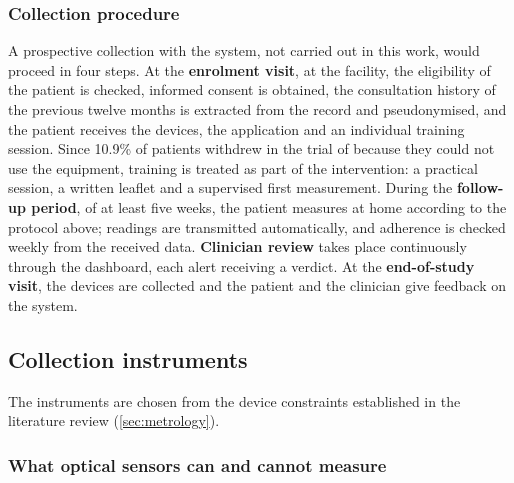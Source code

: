 \subsubsection{Collection procedure}\label{sec:procedure}

A prospective collection with the system, not carried out in this work, would proceed in four steps. At the \textbf{enrolment visit}, at the facility, the eligibility of the patient is checked, informed consent is obtained, the consultation history of the previous twelve months is extracted from the record and pseudonymised, and the patient receives the devices, the application and an individual training session. Since 10.9\% of patients withdrew in the trial of \textcite{mihevc2025} because they could not use the equipment, training is treated as part of the intervention: a practical session, a written leaflet and a supervised first measurement. During the \textbf{follow-up period}, of at least five weeks, the patient measures at home according to the protocol above; readings are transmitted automatically, and adherence is checked weekly from the received data. \textbf{Clinician review} takes place continuously through the dashboard, each alert receiving a verdict. At the \textbf{end-of-study visit}, the devices are collected and the patient and the clinician give feedback on the system.

\subsection{Collection instruments}\label{sec:instruments}

The instruments are chosen from the device constraints established in the literature review (\cref{sec:metrology}).

\subsubsection{What optical sensors can and cannot measure}\label{sec:hardware}\label{sec:ppg}\label{sec:contradiction}\label{sec:device-landscape}\label{sec:lowcost}

